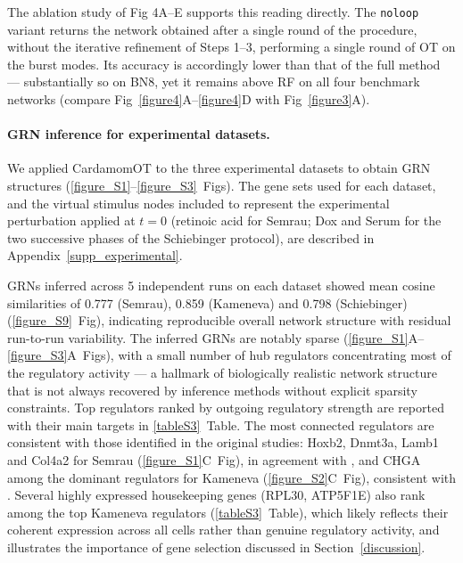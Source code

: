 \documentclass[a4paper, 11pt]{article}
\theoremstyle{plain}
\theoremstyle{remark}
\newcommand*{\firstreview}[1]{{\color{black}#1}}
\begin{document}
The ablation study of Fig 4A–E supports this reading directly. The \texttt{noloop} variant returns the network obtained after a single round of the procedure, without the iterative refinement of Steps 1–3, performing a single round of OT on the burst modes. Its accuracy is accordingly lower than that of the full method — substantially so on BN8, yet it remains above RF on all four benchmark networks (compare Fig~\ref{figure4}A--\ref{figure4}D with Fig~\ref{figure3}A).

\paragraph{GRN inference for experimental datasets.}
We applied CardamomOT to the three experimental datasets to obtain GRN structures
(\ref{figure_S1}--\ref{figure_S3}~Figs). The gene sets used for each dataset, and the virtual
stimulus nodes included to represent the experimental perturbation applied at $t=0$ (retinoic
acid for Semrau; Dox and Serum for the two successive phases of the Schiebinger protocol), are
described in Appendix~\ref{supp_experimental}.

\firstreview{GRNs inferred across 5 independent runs on each dataset showed mean cosine
similarities of 0.777 (Semrau), 0.859 (Kameneva) and 0.798 (Schiebinger)
(\ref{figure_S9}~Fig), indicating reproducible overall network structure with residual
run-to-run variability.} The inferred GRNs are notably sparse
(\ref{figure_S1}A--\ref{figure_S3}A~Figs), with a small number of hub regulators
concentrating most of the regulatory activity --- a hallmark of biologically realistic network
structure \cite{Grotewold2018, sanguinetti2019gene} that is not always recovered by inference
methods without explicit sparsity constraints. \firstreview{Top regulators ranked by outgoing
regulatory strength are reported with their main targets in \ref{tableS3}~Table.} The most
connected regulators are consistent with those identified in the original studies: Hoxb2,
Dnmt3a, Lamb1 and Col4a2 for Semrau (\ref{figure_S1}C~Fig), in agreement with \cite{Semrau_2017},
and CHGA among the dominant regulators for Kameneva (\ref{figure_S2}C~Fig), consistent with
\cite{gandrillon2025inferring}. \firstreview{Several highly expressed housekeeping genes (RPL30,
ATP5F1E) also rank among the top Kameneva regulators (\ref{tableS3}~Table), which likely
reflects their coherent expression across all cells rather than genuine regulatory activity, and
illustrates the importance of gene selection discussed in Section~\ref{discussion}.}
\end{document}
